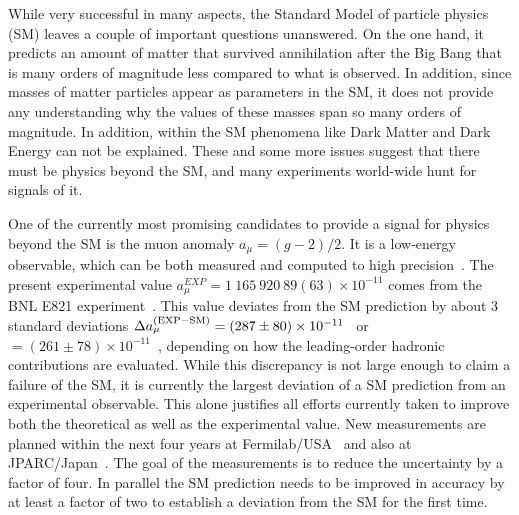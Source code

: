 \documentclass[preprint,12pt,3p]{elsarticle}
\newcommand{\0}{}
\begin{document}
While very successful in many aspects, the Standard Model of particle physics (SM)
leaves a couple of important questions unanswered. On the one hand, it predicts
an amount of matter that survived annihilation after the Big Bang that is many orders
of magnitude less compared to what is observed. In addition, since masses
of matter particles appear as parameters in the SM, it does not provide any understanding
why the values of these masses span so many orders of magnitude.
In addition, within the SM phenomena like Dark Matter and Dark Energy can not be explained.
 These and some more 
issues suggest that there must be physics beyond the SM, and many experiments
world-wide hunt for signals of it. 

One of the currently most promising candidates to provide a signal for physics beyond the SM
is the muon anomaly $a_\mu = (g-2)/2$. It is a low-energy observable, which
can be both measured and computed to high precision~\cite{Jegerlehner:2009ry,Blum:2013xva}.  The present experimental
value $a_\mu^{EXP}= 1\ 165\ 920\ 89 (63)\times 10^{-11}$
 comes from the BNL E821 experiment~\cite{Bennett:2006fi}.  This value
deviates from the SM prediction by about 3 standard
deviations $\Delta a_\mu^{({\rm EXP-SM})}= (287\pm 80)\times 10^{-11}$~\cite{Davier:2010nc} 
or $= (261\pm 78)\times 10^{-11}$~\cite{Hagiwara:2011af}, depending on how the leading-order
hadronic contributions are evaluated.  While this discrepancy
is not large enough to claim a failure of the SM, it is currently the largest
deviation of a SM prediction from an experimental observable. This
alone justifies all efforts currently taken to improve both the theoretical as well as the experimental value.
New measurements are planned within the next four years at 
Fermilab/USA~\cite{Grange:2015fou} and also at JPARC/Japan~\cite{Saito:2012zz}. The goal
of the measurements is to reduce the uncertainty by a factor of four. 
In parallel the SM prediction needs to be improved in accuracy 
 by at least a factor of two to establish a deviation from the SM for the first time.
 
\end{document}
